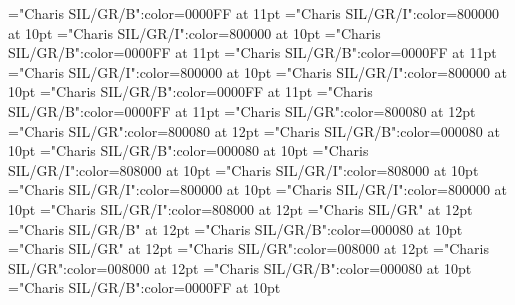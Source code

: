 \documentclass[a4paper,twoside]{article}
\begin{document}
\font\spanheadwordvariantformentrybackrefvariantformentrybackrefsminorentryvariant="Charis SIL/GR/B":color=0000FF at 11pt
\font\spanesabbreviationvariantentrytypevariantentrytypesvariantformentrybackrefsbminorentryvariant="Charis SIL/GR/I":color=800000 at 10pt
\font\spanabbreviationvariantentrytypevariantentrytypesvariantformentrybackrefsbminorentryvariant="Charis SIL/GR/I":color=800000 at 10pt
\font\spanmxbheadwordvariantformentrybackrefbvariantformentrybackrefsbminorentryvariant="Charis SIL/GR/B":color=0000FF at 11pt
\font\spanheadwordvariantformentrybackrefbvariantformentrybackrefsbminorentryvariant="Charis SIL/GR/B":color=0000FF at 11pt
\font\spanesownertypeabbreviationminimallexreferenceminimallexreferencesminorentryvariant="Charis SIL/GR/I":color=800000 at 10pt
\font\spanownertypeabbreviationminimallexreferenceminimallexreferencesminorentryvariant="Charis SIL/GR/I":color=800000 at 10pt
\font\spanmxbheadwordconfigtargetconfigtargetsminimallexreferenceminimallexreferencesminorentryvariant="Charis SIL/GR/B":color=0000FF at 11pt
\font\spanheadwordconfigtargetconfigtargetsminimallexreferenceminimallexreferencesminorentryvariant="Charis SIL/GR/B":color=0000FF at 11pt
\font\spanesliteralmeaningminorentryvariant="Charis SIL/GR":color=800080 at 12pt
\font\spanliteralmeaningminorentryvariant="Charis SIL/GR":color=800080 at 12pt
\font\spanmxbexampleexamplescontentsmainentrysubsenses="Charis SIL/GR/B":color=000080 at 10pt
\font\spanexampleexamplescontentsmainentrysubsenses="Charis SIL/GR/B":color=000080 at 10pt
\font\spanesownertypeabbreviationlexsensereferencelexsensereferencesmainentrysubsenses="Charis SIL/GR/I":color=808000 at 10pt
\font\spanownertypeabbreviationlexsensereferencelexsensereferencesmainentrysubsenses="Charis SIL/GR/I":color=808000 at 10pt
\font\spanmxbheadwordconfigtargetconfigtargetslexsensereferencelexsensereferencesmainentrysubsenses="Charis SIL/GR/I":color=800000 at 10pt
\font\spanheadwordconfigtargetconfigtargetslexsensereferencelexsensereferencesmainentrysubsenses="Charis SIL/GR/I":color=800000 at 10pt
\font\translationstes="Charis SIL/GR/I":color=808000 at 12pt
\font\spanheadwordconfigtargetconfigtargets="Charis SIL/GR" at 12pt
\font{}="Charis SIL/GR/B" at 12pt
\font{}="Charis SIL/GR/B":color=000080 at 10pt
\font{}="Charis SIL/GR" at 12pt
\font\entryletDatadicBody="Charis SIL/GR":color=008000 at 12pt
\font\mainheadwordentryletDatadicBody="Charis SIL/GR":color=008000 at 12pt
\font\spanmxbmainheadwordentryletDatadicBody="Charis SIL/GR/B":color=000080 at 10pt
\font\aspanmxbmainheadwordentryletDatadicBody="Charis SIL/GR/B":color=0000FF at 10pt
\end{document}
